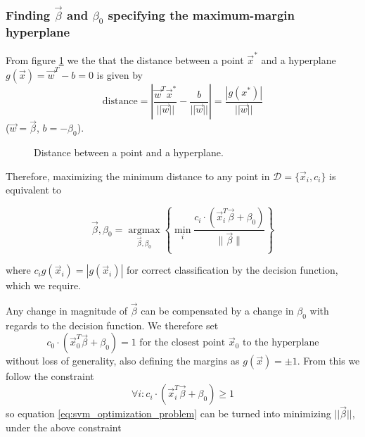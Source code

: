 \subsubsection{Finding $\vec{\beta}$ and $\beta_0$ specifying the maximum-margin hyperplane}
From figure \ref{fig:dist_p_h} we the that the distance between a point $\vec{x}^*$ and
a hyperplane $g(\vec{x}) = \vec{w}^T - b = 0$ is given by
\begin{equation}
    \text{distance} = \left| \frac{\vec{w}^T\vec{x}^*}{||\vec{w}||} - \frac{b}{||\vec{w}||} \right| = \frac{|g(x^*)|}{||\vec{w}||}
\end{equation}
($\vec{w} = \vec{\beta}$, $b = -\beta_0$).

\begin{figure}[!htb]
    \centering
    
    \caption{Distance between a point and a hyperplane.}
    \label{fig:dist_p_h}
\end{figure}

Therefore, maximizing the minimum distance to any point in $\mathcal{D} = \{ \vec{x}_i, c_i \}$ is equivalent to

\begin{equation}
    \label{eq:svm_optimization_problem}
    \vec{\beta}, \beta_0=\underset{\vec{\beta}, \beta_0}{\operatorname{argmax}}\left\{\min _i \frac{c_i \cdot\left(\vec{x}_i^T \vec{\beta}+\beta_0\right)}{\|\vec{\beta}\|}\right\}
\end{equation}

where $c_i g(\vec{x}_i) = |g(\vec{x}_i)|$ for correct classification by the decision function, which we require.

Any change in magnitude of $\vec{\beta}$ can be compensated by a change in $\beta_0$
with regards to the decision function. We therefore set
\begin{equation}
    c_0 \cdot (\vec{x}_0^T \vec{\beta} + \beta_0) = 1 \text{ for the closest point } \vec{x}_0 \text{ to the hyperplane}
\end{equation}
without loss of generality, also defining the margins as $g(\vec{x}) = \pm 1$. From this
we follow the constraint
\begin{equation}
    \forall i: c_i \cdot (\vec{x}_i^T \vec{\beta} + \beta_0) \geq 1
\end{equation}
so equation \ref{eq:svm_optimization_problem} can be turned into minimizing $||\vec{\beta}||$,
under the above constraint

